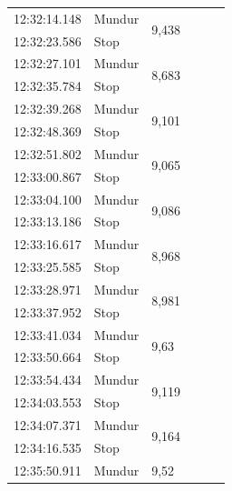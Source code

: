 \begin{longtable}{|l|l|l|l|l|l|}
  \hline
  12:32:14.148           & Mundur                & \multirow{2}{*}{9,438}           \\
  \cline{1-2}
  12:32:23.586           & Stop                &            \\
  \hline
  12:32:27.101           & Mundur                & \multirow{2}{*}{8,683}           \\
  \cline{1-2}
  12:32:35.784           & Stop                &            \\  
  \hline
  12:32:39.268           & Mundur                & \multirow{2}{*}{9,101}            \\
  \cline{1-2}
  12:32:48.369           & Stop                &             \\
  \hline
  12:32:51.802           & Mundur                & \multirow{2}{*}{9,065}            \\
  \cline{1-2}
  12:33:00.867           & Stop                &            \\
  \hline
  12:33:04.100           & Mundur                & \multirow{2}{*}{9,086}           \\
  \cline{1-2}
  12:33:13.186           & Stop                &           \\
  \hline
  12:33:16.617           & Mundur                & \multirow{2}{*}{8,968}            \\
  \cline{1-2}
  12:33:25.585           & Stop                &             \\
  \hline
  12:33:28.971           & Mundur                & \multirow{2}{*}{8,981}            \\
  \cline{1-2}
  12:33:37.952           & Stop                &            \\
  \hline
  12:33:41.034           & Mundur                & \multirow{2}{*}{9,63}           \\
  \cline{1-2}
  12:33:50.664           & Stop                &            \\
  \hline
  12:33:54.434           & Mundur                & \multirow{2}{*}{9,119}           \\
  \cline{1-2}
  12:34:03.553           & Stop                &            \\
  \hline
  12:34:07.371           & Mundur                & \multirow{2}{*}{9,164}           \\
  \cline{1-2}
  12:34:16.535           & Stop                &            \\
  \hline
  12:35:50.911           & Mundur                & \multirow{2}{*}{9,52}           \\  

\end{longtable}
